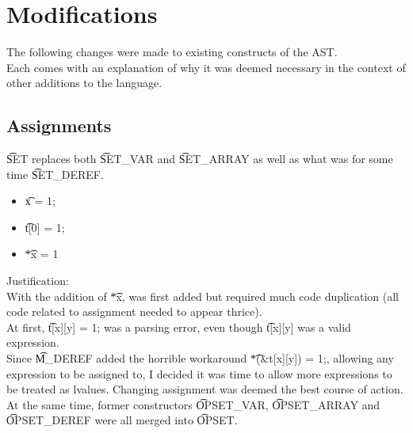 \section{Modifications}
The following changes were made to existing constructs of the AST.\\
Each comes with an explanation of why it was deemed necessary in the context of other additions to the language.

\subsection{Assignments}
\t{SET} replaces both \t{SET\_VAR} and \t{SET\_ARRAY} as well as what was for some time \t{SET\_DEREF}.\\
\begin{itemize}
    \item \t{x = 1;}
    \not\to\ 
    \to\ 
    \item \t{t[0] = 1;}
    \not\to\ 
    \to\ 
    \item \t{*x = 1}
    \not\to\ 
    \to\ 
\end{itemize}

Justification:\\
With the addition of \t{*x},  was first added but required much code duplication (all code related to assignment needed to appear thrice).\\
At first, \t{t[x][y] = 1;} was a parsing error, even though \t{t[x][y]} was a valid expression.\\
Since \t{M\_DEREF} added the horrible workaround \t{*(\&t[x][y]) = 1;}, allowing any expression to be assigned to, I decided it was time to allow more expressions to be treated as lvalues. Changing assignment was deemed the best course of action.\\
At the same time, former constructors \t{OPSET\_VAR}, \t{OPSET\_ARRAY} and \t{OPSET\_DEREF} were all merged into \t{OPSET}.


